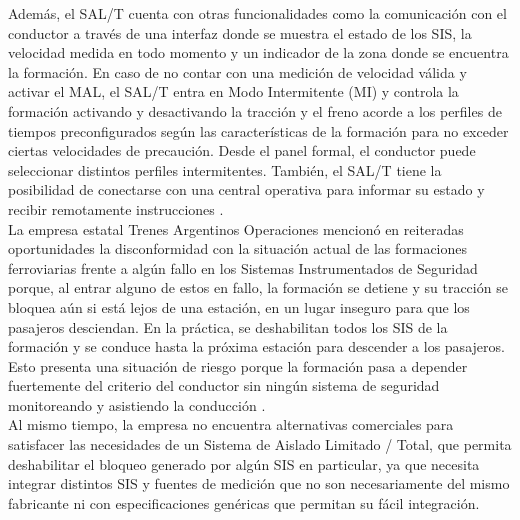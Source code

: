 Además, el SAL/T cuenta con otras funcionalidades como la comunicación con el conductor a través de una interfaz donde se muestra el estado de los SIS, la velocidad medida en todo momento y un indicador de la zona donde se encuentra la formación. En caso de no contar con una medición de velocidad válida y activar el MAL, el SAL/T entra en Modo Intermitente (MI) y controla la formación activando y desactivando la tracción y el freno acorde a los perfiles de tiempos preconfigurados según las características de la formación para no exceder ciertas velocidades de precaución. Desde el panel formal, el conductor puede seleccionar distintos perfiles intermitentes.  También, el SAL/T tiene la posibilidad de conectarse con una central operativa para informar su estado y recibir remotamente instrucciones \cite{salt_paper}. \\


La empresa estatal Trenes Argentinos Operaciones \cite{trenes_arg} mencionó en reiteradas oportunidades la disconformidad con la situación actual de las formaciones ferroviarias frente a algún fallo en los Sistemas Instrumentados de Seguridad porque, al entrar alguno de estos en fallo,
la formación se detiene y su tracción se bloquea aún si está lejos de una estación, en un lugar inseguro para que los pasajeros desciendan. En la práctica, se deshabilitan todos los SIS de la formación y se conduce hasta la próxima estación para descender a los pasajeros. Esto presenta una situación de riesgo porque la formación pasa a depender fuertemente del criterio del conductor sin ningún sistema de seguridad monitoreando y asistiendo la conducción \cite{salt_paper}. \\

Al mismo tiempo, la empresa no encuentra alternativas comerciales para satisfacer las necesidades de un Sistema de Aislado Limitado / Total, que permita deshabilitar el bloqueo generado por algún SIS en particular, ya que necesita integrar distintos SIS y fuentes de medición que no son necesariamente del mismo fabricante ni con especificaciones genéricas que permitan su fácil integración.  \\

